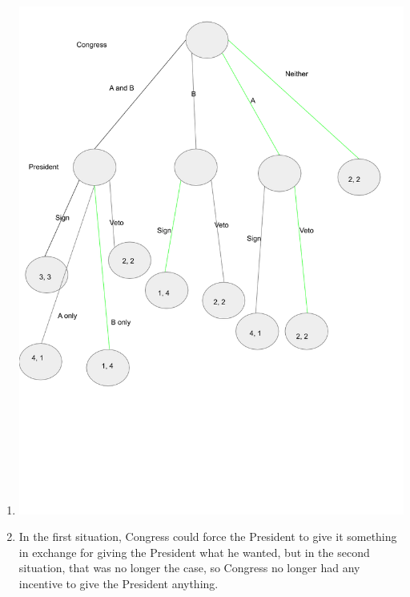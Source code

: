 \documentclass[letterpaper]{article}
\begin{document}
\begin{enumerate}
    \item \includegraphics[scale=0.4]{fig2}
    \item In the first situation, Congress could force the President to give it something in exchange for giving the President what he wanted, but in the second situation, that was no longer the case, so Congress no longer had any incentive to give the President anything.
\end{enumerate}
\end{document}
